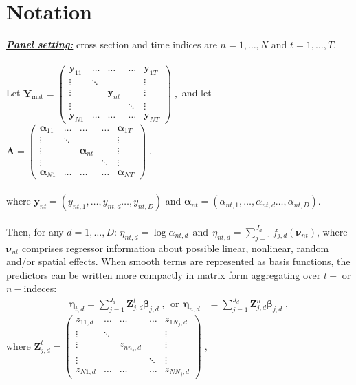 \documentclass[a4paper,12pt]{scrartcl} %
\newcommand{\bs}{\boldsymbol}  %
\newcommand{\antd}{\alpha_{nt,d}}
\newcommand{\bjnd}{\bs{\beta}_{j,d}}
\newcommand{\bjtd}{\bs{\beta}_{j,d}}
\newcommand{\Zjtd}{\bs{Z}_{j,d}^{t}}
\newcommand{\Zjnd}{\bs{Z}_{j,d}^{n}}
\newcommand{\etantd}{\eta_{nt,d}}
\newcommand{\sumJd}{\sum_{j=1}^{J_d}}
\begin{document}
\section{Notation}
\underline{\textbf{\textit{Panel setting:}}} cross section and time indices are $n=1,\ldots,N$  and $t=1,\ldots,T$.\\\\
Let
$
\bs{Y}_{\text{mat}}=
\begin{pmatrix}
\bs{y}_{11} & \ldots & \ldots & \ldots & \bs{y}_{1T} \\ 
\vdots & \ddots &  &  & \vdots \\ 
\vdots &  & \bs{y}_{nt} &  & \vdots \\ 
\vdots &  &  & \ddots & \vdots \\ 
\bs{y}_{N1} & \ldots & \ldots & \ldots & \bs{y}_{NT}
\end{pmatrix}\;,
$
and let
$
\bs{A}=
\begin{pmatrix}
\bs{\alpha}_{11} & \ldots & \ldots & \ldots & \bs{\alpha}_{1T} \\ 
\vdots & \ddots &  &  & \vdots \\ 
\vdots &  & \bs{\alpha}_{nt} &  & \vdots \\ 
\vdots &  &  & \ddots & \vdots \\ 
\bs{\alpha}_{N1} & \ldots & \ldots & \ldots & \bs{\alpha}_{NT}
\end{pmatrix}\;.
$\\\\
where $\bs{y}_{nt}=(y_{nt,1},\ldots,y_{nt,d}\ldots,y_{nt,D})$ and $\bs{\alpha}_{nt}=(\alpha_{nt,1},\ldots,\alpha_{nt,d}\ldots,\alpha_{nt,D})$.\\\\
Then, for any $d=1,\ldots,D$: $
\etantd = \log \antd ~~\text{and}~~\etantd = \sumJd f_{j,d} (\bs{\nu}_{nt})$,
where $\bs{\nu}_{nt}$ comprises regressor information about possible linear, nonlinear, random and/or spatial effects. 
When smooth terms are represented as basis functions, the predictors can be written more compactly in matrix form aggregating over $t-$ or $n-$indeces:
\begin{align*}
\bs{\eta}_{t,d} = \sumJd \Zjtd \bjtd\;, ~~\text{or}~~\bs{\eta}_{n,d} &= \sumJd \Zjnd \bjnd\;,
\end{align*}
where $\Zjtd=
\begin{pmatrix}
z_{11,d} & \ldots & \ldots & \ldots & z_{1N_j,d} \\ 
\vdots & \ddots &  &  & \vdots \\ 
\vdots &  & z_{nn_j,d} &  & \vdots \\ 
\vdots &  &  & \ddots & \vdots \\ 
z_{N1,d} & \ldots & \ldots & \ldots & z_{NN_j,d}
\end{pmatrix}\;,$
\end{document}
